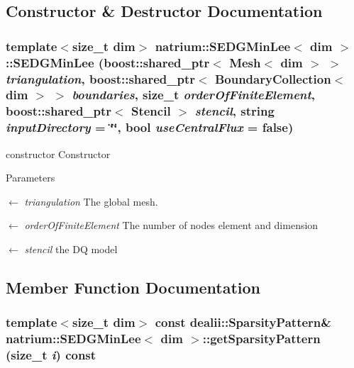 \subsection{Constructor \& Destructor Documentation}
\hypertarget{classnatrium_1_1SEDGMinLee_a429930c197a9ab2a881ffc71aa0dd86b}{
\subsubsection[{SEDGMinLee}]{\setlength{\rightskip}{0pt plus 5cm}template$<$size\_\-t dim$>$ {\bf natrium::SEDGMinLee}$<$ dim $>$::{\bf SEDGMinLee} (boost::shared\_\-ptr$<$ Mesh$<$ dim $>$ $>$ {\em triangulation}, \/  boost::shared\_\-ptr$<$ {\bf BoundaryCollection}$<$ dim $>$ $>$ {\em boundaries}, \/  size\_\-t {\em orderOfFiniteElement}, \/  boost::shared\_\-ptr$<$ {\bf Stencil} $>$ {\em stencil}, \/  string {\em inputDirectory} = {\ttfamily \char`\"{}\char`\"{}}, \/  bool {\em useCentralFlux} = {\ttfamily false})}}
\label{classnatrium_1_1SEDGMinLee_a429930c197a9ab2a881ffc71aa0dd86b}


constructor Constructor 
\begin{DoxyParams}{Parameters}
\item[\mbox{$\leftarrow$} {\em triangulation}]The global mesh. \item[\mbox{$\leftarrow$} {\em orderOfFiniteElement}]The number of nodes element and dimension \item[\mbox{$\leftarrow$} {\em stencil}]the DQ model \end{DoxyParams}


\subsection{Member Function Documentation}
\hypertarget{classnatrium_1_1SEDGMinLee_ac9392932aaab8186b427b9d12bc64771}{
\subsubsection[{getSparsityPattern}]{\setlength{\rightskip}{0pt plus 5cm}template$<$size\_\-t dim$>$ const dealii::SparsityPattern\& {\bf natrium::SEDGMinLee}$<$ dim $>$::getSparsityPattern (size\_\-t {\em i}) const}}
\label{classnatrium_1_1SEDGMinLee_ac9392932aaab8186b427b9d12bc64771}



